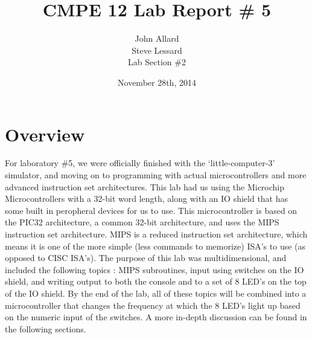 \documentclass[a4paper,11pt]{article}
\title{ CMPE 12 Lab Report \# 5 \\[7 in]}
\author{John Allard \\ Steve Lessard \\ Lab Section \#2}
\date{November 28th, 2014}
\begin{document}
\maketitle
 

\section{Overview}
For laboratory \#5, we were officially finished with the `little-computer-3' simulator, and moving on to programming with actual microcontrollers and more advanced instruction set architectures. This lab had us using the Microchip Microcontrollers with a 32-bit word length, along with an IO shield that has some built in peropheral devices for us to use. This microcontroller is based on the PIC32 architecture, a common 32-bit architecture, and uses the MIPS instruction set architecture. MIPS is a reduced instruction set architecture, which means it is one of the more simple (less commands to memorize) ISA's to use (as opposed to CISC ISA's). The purpose of this lab was multidimensional, and included the following topics : MIPS subroutines, input using switches on the IO shield, and writing output to both the console and to a set of 8 LED's on the top of the IO shield. By the end of the lab, all of these topics will be combined into a microcontroller that changes the frequency at which the 8 LED's light up based on the numeric input of the switches. A more in-depth discussion can be found in the following sections.
\end{document}
